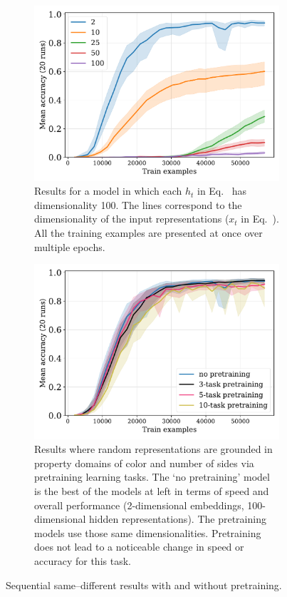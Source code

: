 \documentclass[9pt,twocolumn,twoside,lineno]{pnas-new}
\newcommand{\update}[1]{{\color{darkblue}#1}}
\begin{document}
\begin{figure}[tp]
  \centering
  \begin{subfigure}[t]{0.48\textwidth}
    \centering
    \includegraphics[width=1\linewidth]{../fig/fuzzy-lm-vocab20-train_size-embed_dim-hidden_dim=100.pdf}
    \caption{Results for a model in which each $h_{t}$ in Eq.~ has dimensionality 100. The lines correspond to the dimensionality of the input representations ($x_t$ in Eq.~). All the training examples are presented at once over multiple epochs.}
    \label{fig:fuzzy-lm-results}
  \end{subfigure}
  \hfill
  \begin{subfigure}[t]{0.48\textwidth}
    \centering
    \includegraphics[width=1\linewidth]{../fig/fuzzy-lm-pretrain-compare-train_size-pretrained-embed_dim=None.pdf}
    \caption{\update{Results where random representations are grounded in property domains of color and number of sides via pretraining learning tasks.  The `no pretraining' model is the best of the models at left in terms of speed and overall performance (2-dimensional embeddings, 100-dimensional hidden representations). The pretraining models use those same dimensionalities. Pretraining does not lead to a noticeable change in speed or accuracy for this task.}}
    \label{fig:fuzzy-lm-pretrain-results}
  \end{subfigure}
  \caption{Sequential same--different results with and without pretraining.}
\end{figure}
\end{document}
